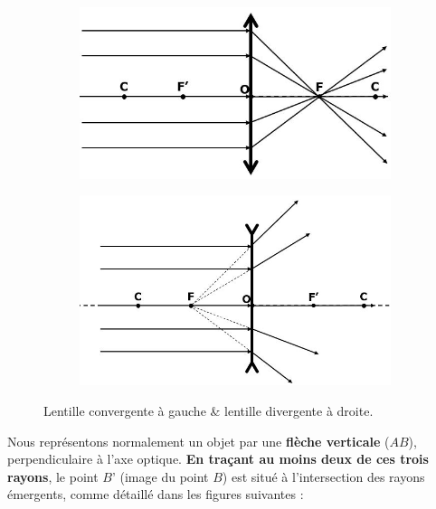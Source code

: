 \documentclass[11pt,a4paper]{article}
\begin{document}
\begin{figure}[ht]
\centering
\begin{subfigure}{.47\textwidth}
  \centering
  \includegraphics[width=.95\linewidth]{imgs/p6/convergente.jpg}  
\end{subfigure}
\begin{subfigure}{.47\textwidth}
  \centering
  \includegraphics[width=.95\linewidth]{imgs/p6/divergente.jpg}  
\end{subfigure}
\caption{Lentille convergente à gauche \& lentille divergente à droite.}
\label{fig:convergediverge}
\end{figure}


Nous représentons normalement un objet par une \textbf{flèche verticale} ($AB$), perpendiculaire à l’axe optique.  \textbf{En traçant au moins deux de ces trois rayons}, le point $B’$ (image du point $B$) est situé à l’intersection des rayons émergents, comme détaillé dans les figures suivantes : 
\end{document}
